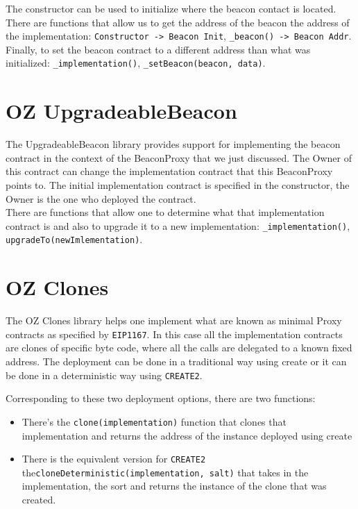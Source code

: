 The constructor can be used to initialize where the beacon contact is located. There are functions that allow us to get the address of the beacon the address of the implementation: \verb|Constructor -> Beacon Init|, \verb|_beacon() -> Beacon Addr|.\\

Finally, to set the beacon contract to a different address than what was initialized: \verb|_implementation()|, \verb|_setBeacon(beacon, data)|. 

\section{OZ UpgradeableBeacon}
The UpgradeableBeacon library provides support for implementing the beacon contract in the context of the BeaconProxy that we just discussed. The Owner of this contract can change the implementation contract that this BeaconProxy points to. The initial implementation contract is specified in the constructor, the Owner is the one who deployed the contract.\\

There are functions that allow one to determine what that implementation contract is and also to upgrade it to a new implementation: \verb|_implementation()|, \verb|upgradeTo(newImlementation)|. 

\section{OZ Clones}

The OZ Clones library helps one implement what are known as minimal Proxy contracts as specified by \verb|EIP1167|. In this case all the implementation contracts are clones of specific byte code, where all the calls are delegated to a known fixed address. The deployment can be done in a traditional way using create or it can be done in a deterministic way using \verb|CREATE2|. 

Corresponding to these two deployment options, there are two functions:
\begin{itemize}
\item There's the \verb|clone(implementation)| function that clones that implementation and returns the address of the instance deployed using create
\item There is the equivalent version for \verb|CREATE2| the\linebreak\verb|cloneDeterministic(implementation, salt)| that takes in the implementation, the sort and returns the instance of the clone that was created.
\end{itemize}

